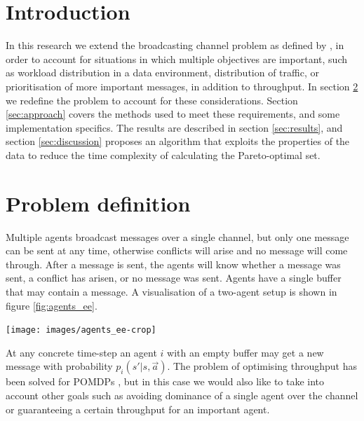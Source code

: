 \documentclass{article}
\makeatletter
\newenvironment{figurehere}
{\def\@captype{figure}}
{}
\makeatother
\begin{document}
	\begin{multicols}{2}

	\section{Introduction}
	\label{sec:introduction}
	In this research we extend the broadcasting channel problem as defined by
	\citet{ooi1996decentralized}, in order to account for situations in which
	multiple objectives are important, such as workload distribution in a data
	environment, distribution of traffic, or prioritisation of more important
	messages, in addition to throughput.
	In section \ref{sec:problem_definition} we redefine the problem to account
	for these considerations. Section \ref{sec:approach} covers the methods used
	to meet these requirements, and some implementation specifics. The results
	are described in section \ref{sec:results}, and section \ref{sec:discussion}
	proposes an algorithm that exploits the properties of the data to reduce the
	time complexity of calculating the Pareto-optimal set.

	\section{Problem definition}
	\label{sec:problem_definition}
	Multiple agents broadcast messages over a single channel, but only one
	message can be sent at any time, otherwise conflicts will arise and no
	message will come through. After a message is sent, the agents will know
	whether a message was sent, a conflict has arisen, or no message was sent.
	Agents have a single buffer that may contain a message. A visualisation of a
	two-agent setup is shown in figure \ref{fig:agents_ee}.

	\vspace{0.5cm}
	\begin{figurehere}
		\centering
		\texttt{[image: images/agents\_ee-crop]}
	   \label{fig:agents_ee}
	\end{figurehere}
	\vspace{0.5cm}

	At any concrete time-step an agent $i$ with an empty buffer may get a new
	message with probability $p_i(s' |s, \vec{a})$.
	The problem of optimising throughput has been solved for POMDPs
	\citep{ooi1996decentralized, hansen2004dynamic}, but in this case we would
	also like to take into account other goals such as avoiding dominance of a
	single agent over the channel or guaranteeing a certain throughput for an
	important agent.


\end{multicols}
\end{document}
